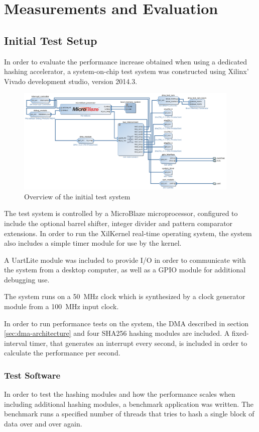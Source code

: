 \chapter{Measurements and Evaluation}

\section{Initial Test Setup}
In order to evaluate the performance increase obtained when using a dedicated
hashing accelerator, a system-on-chip test system was constructed using Xilinx' Vivado
development studio, version 2014.3.

\begin{figure}
	\includegraphics[width=0.95\textwidth]{Figures/testsystem-vivado.png}
	\caption{Overview of the initial test system}
	\label{fig:testsystem-vivado}
\end{figure}

The test system is controlled by a MicroBlaze microprocessor, configured to
include the optional barrel shifter, integer divider and pattern comparator extensions.
In order to run the XilKernel real-time operating system, the system also
includes a simple timer module for use by the kernel.

A UartLite module was included to provide I/O in order to communicate with
the system from a desktop computer, as well as a GPIO module for additional
debugging use.

The system runs on a 50~MHz clock which is synthesized by a clock generator
module from a 100~MHz input clock.

In order to run performance tests on the system, the DMA described in
section \ref{sec:dma-architecture} and four
SHA256 hashing modules are included.
A fixed-interval timer, that generates an interrupt every second, is
included in order to calculate the performance per second.

\subsection{Test Software}
In order to test the hashing modules and how the performance scales when including
additional hashing modules, a benchmark application was written. The benchmark
runs a specified number of threads that tries to hash a single block of data
over and over again.

